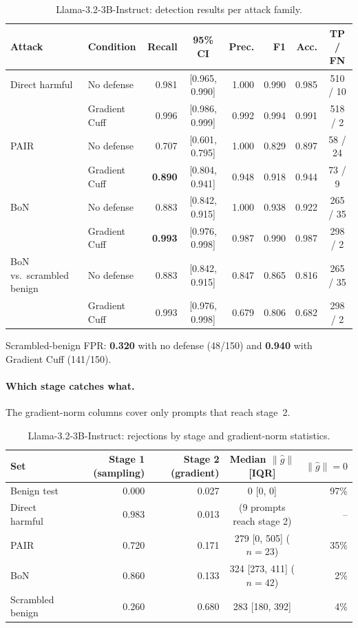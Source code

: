 \documentclass[11pt,a4paper]{article}
\newcommand{\gnorm}{\lVert\hat{g}\rVert}
\begin{document}
\begin{table}[h]
\centering
\caption{Llama-3.2-3B-Instruct: detection results per attack family.}
\label{tab:llama}
\small
\setlength{\tabcolsep}{4pt}
\begin{tabular}{llrcrrrc}
\toprule
Attack & Condition & Recall & 95\% CI & Prec. & F1 & Acc. & TP / FN \\
\midrule
Direct harmful & No defense    & 0.981 & [0.965, 0.990] & 1.000 & 0.990 & 0.985 & 510 / 10 \\
               & Gradient Cuff & 0.996 & [0.986, 0.999] & 0.992 & 0.994 & 0.991 & 518 / 2 \\
\addlinespace
PAIR           & No defense    & 0.707 & [0.601, 0.795] & 1.000 & 0.829 & 0.897 & 58 / 24 \\
               & Gradient Cuff & \textbf{0.890} & [0.804, 0.941] & 0.948 & 0.918 & 0.944 & 73 / 9 \\
\addlinespace
BoN            & No defense    & 0.883 & [0.842, 0.915] & 1.000 & 0.938 & 0.922 & 265 / 35 \\
               & Gradient Cuff & \textbf{0.993} & [0.976, 0.998] & 0.987 & 0.990 & 0.987 & 298 / 2 \\
\addlinespace
BoN vs.\ scrambled benign & No defense    & 0.883 & [0.842, 0.915] & 0.847 & 0.865 & 0.816 & 265 / 35 \\
                          & Gradient Cuff & 0.993 & [0.976, 0.998] & 0.679 & 0.806 & 0.682 & 298 / 2 \\
\bottomrule
\end{tabular}
\end{table}

Scrambled-benign FPR: \textbf{0.320} with no defense (48/150) and \textbf{0.940} with Gradient Cuff (141/150).

\paragraph{Which stage catches what.} The gradient-norm columns cover only prompts that reach stage~2.

\begin{table}[h]
\centering
\caption{Llama-3.2-3B-Instruct: rejections by stage and gradient-norm statistics.}
\label{tab:llama-stage}
\small
\begin{tabular}{lrrcr}
\toprule
Set & Stage 1 (sampling) & Stage 2 (gradient) & Median $\gnorm$ [IQR] & $\gnorm = 0$ \\
\midrule
Benign test      & 0.000 & 0.027 & 0 [0, 0] & 97\% \\
Direct harmful   & 0.983 & 0.013 & (9 prompts reach stage 2) & -- \\
PAIR             & 0.720 & 0.171 & 279 [0, 505] ($n = 23$) & 35\% \\
BoN              & 0.860 & 0.133 & 324 [273, 411] ($n = 42$) & 2\% \\
Scrambled benign & 0.260 & 0.680 & 283 [180, 392] & 4\% \\
\bottomrule
\end{tabular}
\end{table}
\end{document}
